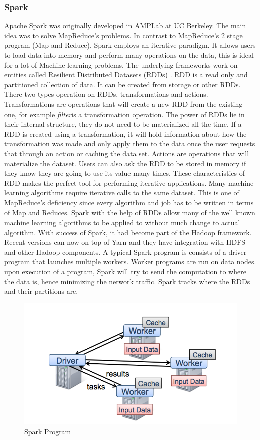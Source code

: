 \documentclass[english]{tktltiki}
\begin{document}
\subsubsection{Spark}
Apache Spark \cite{zaharia10} was originally developed in AMPLab at UC Berkeley. The main idea was to solve MapReduce's problems. In contrast to MapReduce's 2 stage program (Map and Reduce), Spark employs an iterative paradigm. It allows users to load data into memory and perform many operations on the data, this is ideal for a lot of Machine learning problems. The underlying frameworks work on entities called Resilient Distributed Datasets (RDDs) \cite{zaharia12}. RDD  is a read only and partitioned collection of data. It can be created from storage or other RDDs. There two types operation on RDDs, transformations and actions. Transformations are operations that will create a new RDD from the existing one, for example \textit{filter}is a transformation operation. The power of RDDs lie in their internal structure, they do not need to be materialized all the time. If a RDD is created using a transformation, it will hold information about how the transformation was made and only apply them to the data once the user requests that through an action or caching the data set. Actions are operations that will materialize the dataset. Users can also ask the RDD to be stored in memory if they know they are going to use its value many times. These characteristics of RDD makes the perfect tool for performing iterative applications. Many machine learning algorithms require iterative calls to the same dataset. This is one of MapReduce's deficiency since every algorithm and job has to be written in terms of Map and Reduces. Spark with the help of RDDs allow many of the well known machine learning algorithms to be applied to without much change to actual algorithm. With success of Spark, it had become part of the Hadoop framework. Recent versions can now on top of Yarn and they have integration with HDFS and other Hadoop components. 
A typical Spark program is consists of a driver program that launches multiple workers. Worker programs are run on data nodes. upon execution of a program, Spark will try to send the computation to where the data is, hence minimizing the network traffic. Spark tracks where the RDDs and their partitions are.
\begin{figure}[ht!]
\centering
\includegraphics[width=130mm]{figures/sparkprogram.png}
\caption{Spark Program}
\end{figure}
\end{document}
